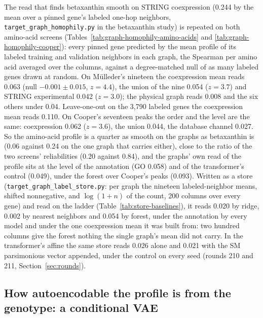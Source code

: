 The read that finds betaxanthin smooth on STRING coexpression (0.244 by the mean over a
pinned gene's labeled one-hop neighbors, \texttt{target\_graph\_homophily.py} in the
betaxanthin study) is repeated on both amino-acid screens
(Tables~\ref{tab:graph-homophily-amino-acids} and \ref{tab:graph-homophily-cooper}):
every pinned gene predicted by the mean profile of its labeled training and validation
neighbors in each graph, the Spearman per amino acid averaged over the columns, against
a degree-matched null of as many labeled genes drawn at random. On M\"ulleder's
nineteen the coexpression mean reads 0.063 (null $-0.001 \pm 0.015$, $z = 4.4$), the
union of the nine 0.054 ($z = 3.7$) and STRING experimental 0.042 ($z = 3.0$); the
physical graph reads 0.008 and the six others under 0.04. Leave-one-out on the 3,790
labeled genes the coexpression mean reads 0.110. On Cooper's seventeen peaks the order
and the level are the same: coexpression 0.062 ($z = 3.6$), the union 0.044, the
database channel 0.027. So the amino-acid profile is a quarter as smooth on the graphs
as betaxanthin is (0.06 against 0.24 on the one graph that carries either), close to the
ratio of the two screens' reliabilities (0.20 against 0.84), and the graphs' own read of
the profile sits at the level of the annotation (GO 0.058) and of the transformer's
control (0.049), under the forest over Cooper's peaks (0.093). Written as a store
(\texttt{target\_graph\_label\_store.py}: per graph the nineteen labeled-neighbor
means, shifted nonnegative, and $\log(1 + n)$ of the count, 200 columns over every
gene) and read on the ladder (Table~\ref{tab:store-baselines}), it reads 0.020 by
ridge, 0.002 by nearest neighbors and 0.054 by forest, under the annotation by every
model and under the one coexpression mean it was built from: two hundred columns
give the forest nothing the single graph's mean did not carry. In the transformer's affine the same
store reads 0.026 alone and 0.021 with the SM parsimonious vector appended, under the
control on every seed (rounds 210 and 211, Section~\ref{sec:rounds}).





\subsection{How autoencodable the profile is from the genotype: a conditional VAE}
\label{sec:cvae}

